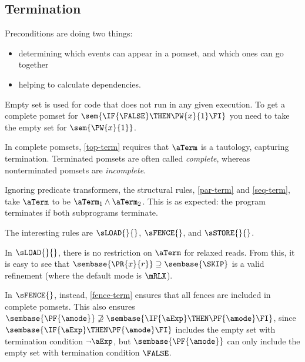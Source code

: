 \subsection{Termination}
\label{sec:ex:term}

Preconditions are doing two things:
\begin{itemize}
\item determining which events can appear in a pomset, and which ones can go
  together
\item helping to calculate dependencies.
\end{itemize}
Empty set is used for code that does not run in any given execution.  To get
a complete pomset for $\sem{\IF{\FALSE}\THEN\PW{x}{1}\FI}$ you need to take
the empty set for $\sem{\PW{x}{1}}$.

In complete pomsets, \ref{top-term} requires that $\aTerm$ is a tautology,
capturing termination.  Terminated pomsets are often called \emph{complete},
whereas nonterminated pomsets are \emph{incomplete}.

Ignoring predicate transformers, the structural rules, \ref{par-term} and
\ref{seq-term}, take $\aTerm$ to be $\aTerm_1\land\aTerm_2$.  This is as
expected: the program terminates if both subprograms terminate.

The interesting rules are $\sLOAD{}{}$, $\sFENCE{}$, and $\sSTORE{}{}$.


In $\sLOAD{}{}$, there is no restriction on $\aTerm$ for relaxed reads.  From
this, it is easy to see that
\begin{math}
  \sembase{\PR{x}{r}}
  \supseteq
  \sembase{\SKIP}
\end{math}
is a valid refinement (where the default mode is $\mRLX$).

In $\sFENCE{}$, instead, \ref{fence-term} ensures that all fences are included in complete pomsets.
This also ensures
$\sembase{\PF{\amode}}\not\supseteq\sembase{\IF{\aExp}\THEN\PF{\amode}\FI}$,
since $\sembase{\IF{\aExp}\THEN\PF{\amode}\FI}$ includes the empty set with
termination condition $\lnot\aExp$, but $\sembase{\PF{\amode}}$ can only
include the empty set with termination condition $\FALSE$.

